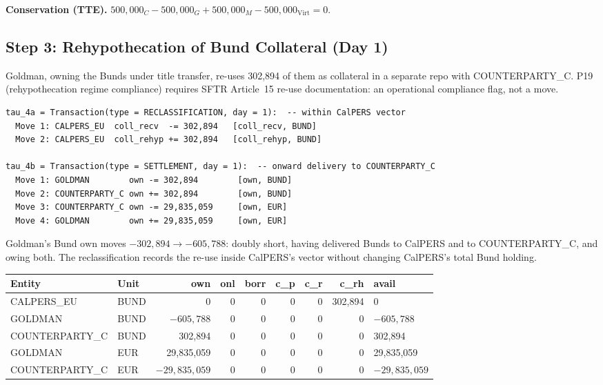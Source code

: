 \documentclass[11pt,a4paper]{article}
\begin{document}
\noindent\textbf{Conservation (TTE).} $500{,}000_C - 500{,}000_G + 500{,}000_M - 500{,}000_{\mathrm{Virt}} = 0$. \checkmark

\subsection{Step 3: Rehypothecation of Bund Collateral (Day 1)}
\label{sec:eu-step3}

Goldman, owning the Bunds under title transfer, re-uses 302{,}894 of them as collateral in a separate repo with COUNTERPARTY\_C. P19 (rehypothecation regime compliance) requires SFTR Article~15 re-use documentation: an operational compliance flag, not a move.

\begin{lstlisting}
tau_4a = Transaction(type = RECLASSIFICATION, day = 1):  -- within CalPERS vector
  Move 1: CALPERS_EU  coll_recv  -= 302,894   [coll_recv, BUND]
  Move 2: CALPERS_EU  coll_rehyp += 302,894   [coll_rehyp, BUND]

tau_4b = Transaction(type = SETTLEMENT, day = 1):  -- onward delivery to COUNTERPARTY_C
  Move 1: GOLDMAN        own -= 302,894        [own, BUND]
  Move 2: COUNTERPARTY_C own += 302,894        [own, BUND]
  Move 3: COUNTERPARTY_C own -= 29,835,059     [own, EUR]
  Move 4: GOLDMAN        own += 29,835,059     [own, EUR]
\end{lstlisting}

\noindent Goldman's Bund $\mathrm{own}$ moves $-302{,}894 \to -605{,}788$: doubly short, having delivered Bunds to CalPERS and to COUNTERPARTY\_C, and owing both. The reclassification records the re-use inside CalPERS's vector without changing CalPERS's total Bund holding.

\begin{center}\small
\begin{tabular}{l l r r r r r r l}
\toprule
\textbf{Entity} & \textbf{Unit} & own & onl & borr & c\_p & c\_r & c\_rh & avail \\
\midrule
CALPERS\_EU & BUND & 0 & 0 & 0 & 0 & 0 & 302{,}894 & 0 \\
GOLDMAN & BUND & $-605{,}788$ & 0 & 0 & 0 & 0 & 0 & $-605{,}788$ \\
COUNTERPARTY\_C & BUND & 302{,}894 & 0 & 0 & 0 & 0 & 0 & 302{,}894 \\
GOLDMAN & EUR & 29{,}835{,}059 & 0 & 0 & 0 & 0 & 0 & 29{,}835{,}059 \\
COUNTERPARTY\_C & EUR & $-29{,}835{,}059$ & 0 & 0 & 0 & 0 & 0 & $-29{,}835{,}059$ \\
\bottomrule
\end{tabular}
\end{center}
\end{document}
